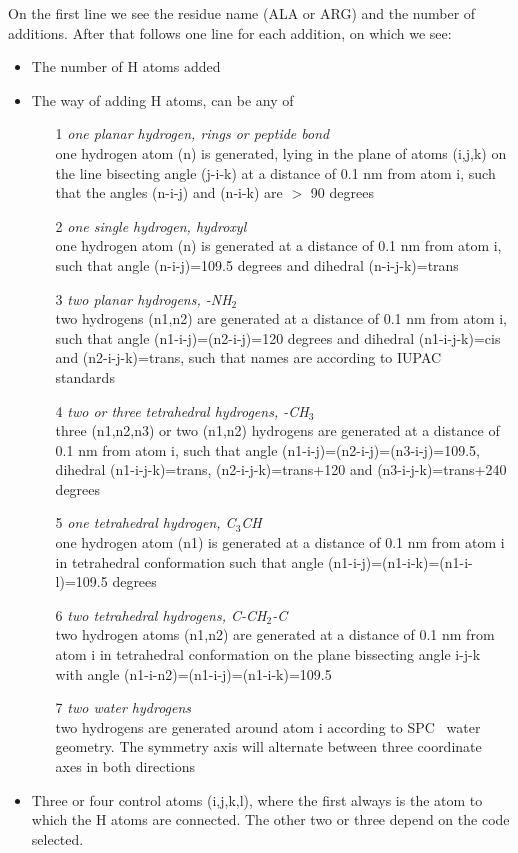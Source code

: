 On the first line we see the residue name (ALA or ARG) and the number
of additions. After that follows one line for each addition, on which
we see:
\begin{itemize}
\item The number of H atoms added
\item The way of adding H atoms, can be any of
\begin{enumerate}
\item[1]{\em one planar hydrogen, {\eg} rings or peptide bond}\\
one hydrogen atom (n) is generated, lying in the plane of atoms
(i,j,k) on the line bisecting angle (j-i-k) at a distance of 0.1 nm
from atom i, such that the angles (n-i-j) and (n-i-k) are $>$ 90
degrees
\item[2]{\em one single hydrogen, {\eg} hydroxyl}\\
one hydrogen atom (n) is generated at a distance of 0.1 nm from atom
i, such that angle (n-i-j)=109.5 degrees and dihedral (n-i-j-k)=trans
\item[3]{\em two planar hydrogens, {\eg} -NH{$_2$}}\\
two hydrogens (n1,n2) are generated at a distance of 0.1 nm from atom
i, such that angle (n1-i-j)=(n2-i-j)=120 degrees and dihedral
(n1-i-j-k)=cis and (n2-i-j-k)=trans, such that names are according to
IUPAC standards~\cite{iupac70}
\item[4]{\em two or three tetrahedral hydrogens, {\eg} -CH{$_3$}}\\
three (n1,n2,n3) or two (n1,n2) hydrogens are generated at a distance
of 0.1 nm from atom i, such that angle
(n1-i-j)=(n2-i-j)=(n3-i-j)=109.5, dihedral (n1-i-j-k)=trans,
(n2-i-j-k)=trans+120 and (n3-i-j-k)=trans+240 degrees
\item[5]{\em one tetrahedral hydrogen, {\eg} C{$_3$}CH}\\
one hydrogen atom (n1) is generated at a distance of 0.1 nm from atom
i in tetrahedral conformation such that angle
(n1-i-j)=(n1-i-k)=(n1-i-l)=109.5 degrees
\item[6]{\em two tetrahedral hydrogens, {\eg} C-CH{$_2$}-C}\\
two hydrogen atoms (n1,n2) are generated at a distance of 0.1 nm from
atom i in tetrahedral conformation on the plane bissecting angle i-j-k
with angle (n1-i-n2)=(n1-i-j)=(n1-i-k)=109.5
\item[7]{\em two water hydrogens}\\
two hydrogens are generated around atom i according to
SPC~\cite{Berendsen81} water geometry. The symmetry axis will
alternate between three coordinate axes in both directions
\end{enumerate}
\item
Three or four control atoms (i,j,k,l), where the first always is the
atom to which the H atoms are connected. The other two or three depend
on the code selected.
\end{itemize}

